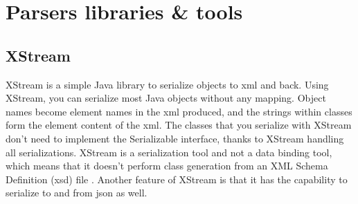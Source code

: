\section{Parsers libraries \& tools}

\subsection{XStream}
XStream is a simple Java library to serialize objects to \gls{xml} and back. Using XStream, you can serialize most Java objects without any mapping. Object names become element names in the \gls{xml} produced, and the strings within classes form the element content of the \gls{xml}.
\newline
\newline
The classes that you serialize with XStream don't need to implement the Serializable interface, thanks to XStream handling all serializations. XStream is a serialization tool and not a data binding tool, which means that it doesn't perform class generation from an XML Schema Definition (\gls{xsd}) file \cite{bib:xstream} \cite{bib:ibm}.
\newline
\newline
Another feature of XStream is that it has the capability to serialize to and from \gls{json} as well.

